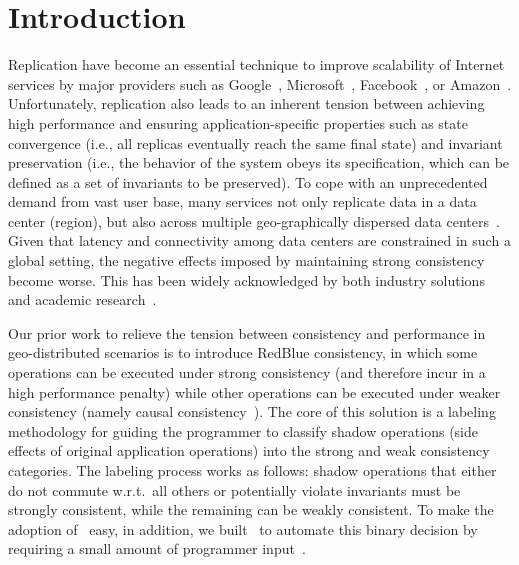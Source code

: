 \section{Introduction}
\label{sect:introduction}
Replication have become an essential technique to improve
scalability of Internet services by major providers such as Google~\cite{GoogleWeb},
Microsoft~\cite{MicrosoftWeb}, Facebook~\cite{FacebookWeb}, or Amazon~\cite{AmazonWeb}. 
Unfortunately, replication also leads to an inherent
tension between achieving high performance and ensuring application-specific
properties such as state convergence (i.e., all replicas eventually reach the same final state)
and invariant preservation (i.e., the behavior of the system
obeys its specification, which can be defined as a set of invariants to
be preserved). To cope with an unprecedented demand from vast user base,
many services not only replicate data in a data center (region), but also across
multiple geo-graphically dispersed data centers~\cite{Sharma2015Wormhole, Corbett2012Spanner}.
Given that latency and connectivity among data centers are constrained
in such a global setting, the negative effects imposed by maintaining strong consistency
become worse. This has been widely acknowledged by both industry
solutions~\cite{Decandia2007Dynamo} and academic research~\cite{Sovran2011PSI, Li2012RedBlue, Balegas2015Eventual, Bailis2014Avoid}.

Our prior work to relieve the tension between consistency and performance
in geo-distributed scenarios is to introduce RedBlue consistency, in which some operations can be executed
under strong consistency (and therefore incur in a high performance penalty) while other
operations can be executed under weaker consistency (namely causal consistency~\cite{Lloyd2011Causal}).
The core of this solution is a labeling methodology for guiding the programmer to
classify shadow operations (side effects of original
application operations) into the strong and weak consistency categories. The labeling
process works as follows: shadow operations that
either do not commute w.r.t.\ all others or potentially violate invariants must
be strongly consistent, while the remaining can be weakly consistent. To make
the adoption of \RBCN\ easy, in addition, we built \tool\ to
automate this binary decision by requiring a small amount of programmer input~\cite{Li2014SIEVE}.

